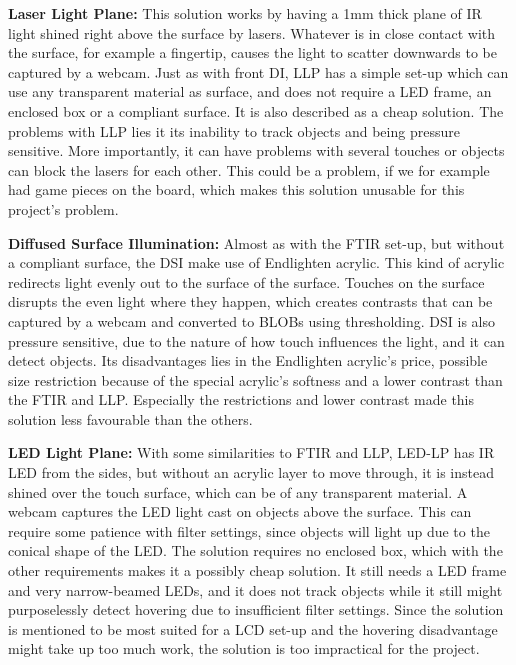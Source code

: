 \textbf{Laser Light Plane:} This solution works by having a 1mm thick plane of IR light shined right above the surface by lasers. Whatever is in close contact with the surface, for example a fingertip, causes the light to scatter downwards to be captured by a webcam. Just as with front DI, LLP has a simple set-up which can use any transparent material as surface, and does not require a LED frame, an enclosed box or a compliant surface. It is also described as a cheap solution. The problems with LLP lies it its inability to track objects and being pressure sensitive. More importantly, it can have problems with several touches or objects can block the lasers for each other. This could be a problem, if we for example had game pieces on the board, which makes this solution unusable for this project's problem. 
 
\textbf{Diffused Surface Illumination:} Almost as with the FTIR set-up, but without a compliant surface, the DSI make use of Endlighten acrylic. This kind of acrylic redirects light evenly out to the surface of the surface.  Touches on the surface disrupts the even light where they happen, which creates contrasts that can be captured by a webcam and converted to BLOBs using thresholding. DSI is also pressure sensitive, due to the nature of how touch influences the light, and it can detect objects. Its disadvantages lies in the Endlighten acrylic's price, possible size restriction because of the special acrylic's softness and a lower contrast than the FTIR and LLP. Especially the restrictions and lower contrast made this solution less favourable than the others.

\textbf{LED Light Plane:} With some similarities to FTIR and LLP, LED-LP has IR LED from the sides, but without an acrylic layer to move through, it is instead shined over the touch surface, which can be of any transparent material. A webcam captures the LED light cast on objects above the surface. This can require some patience with filter settings, since objects will light up due to the conical shape of the LED. The solution requires no enclosed box, which with the other requirements makes it a possibly cheap solution. It still needs a LED frame and very narrow-beamed LEDs, and it does not track objects while it still might purposelessly detect hovering due to insufficient filter settings. Since the solution is mentioned to be most suited for a LCD set-up and the hovering disadvantage might take up too much work, the solution is too impractical for the project.

